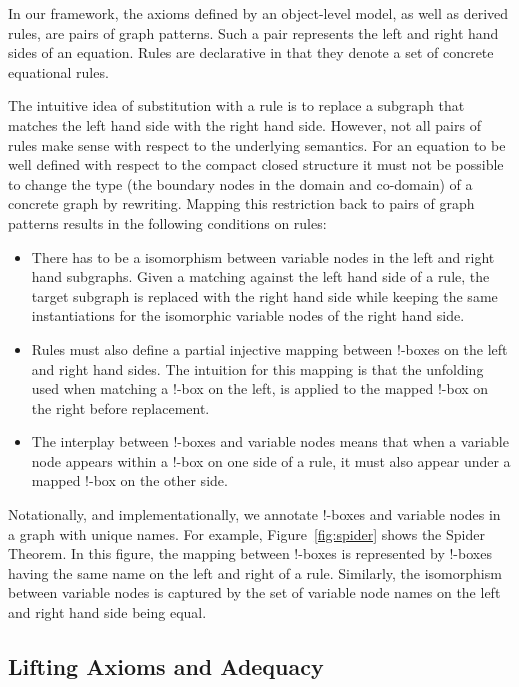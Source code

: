 \documentclass[runningheads]{llncs}
\begin{document}
In our framework, the axioms defined by an object-level model, as well
as derived rules, are pairs of graph patterns. Such a pair represents
the left and right hand sides of an equation. Rules are declarative in
that they denote a set of concrete equational rules.

The intuitive idea of substitution with a rule is to replace a
subgraph that matches the left hand side with the right hand side.
However, not all pairs of rules make sense with respect to the
underlying semantics. For an equation to be well defined with respect
to the compact closed structure it must not be possible to change the
type (the boundary nodes in the domain and co-domain) of a concrete
graph by rewriting.  Mapping this restriction back to pairs of graph
patterns results in the following conditions on rules:

\begin{itemize}

\item There has to be a isomorphism between variable nodes in the left
  and right hand subgraphs. Given a matching against the left hand
  side of a rule, the target subgraph is replaced with the right hand
  side while keeping the same instantiations for the isomorphic
  variable nodes of the right hand side.

\item Rules must also define a partial injective mapping between
  !-boxes on the left and right hand sides. The intuition for this
  mapping is that the unfolding used when matching a !-box on the
  left, is applied to the mapped !-box on the right before
  replacement.

\item The interplay between !-boxes and variable nodes means that when
  a variable node appears within a !-box on one side of a rule, it must
  also appear under a mapped !-box on the other side.

\end{itemize}

Notationally, and implementationally, we annotate !-boxes and variable
nodes in a graph with unique names. For example,
Figure~\ref{fig:spider} shows the Spider Theorem. In this figure, the
mapping between !-boxes is represented by !-boxes having the same name
on the left and right of a rule.  Similarly, the isomorphism between
variable nodes is captured by the set of variable node names on the
left and right hand side being equal.

\subsection{Lifting Axioms and Adequacy} 
\end{document}
